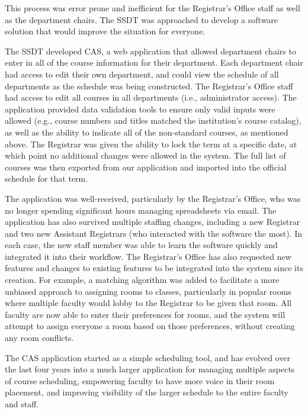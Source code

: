 This process was error prone and inefficient for the Registrar's Office staff as well as the department chairs. The SSDT was approached to develop a software solution that would improve the situation for everyone.

The SSDT developed CAS, a web application that allowed department chairs to enter in all of the course information for their department. Each department chair had access to edit their own department, and could view the schedule of all departments as the schedule was being constructed. The Registrar's Office staff had access to edit all courses in all departments (i.e., administrator access). The application provided data validation tools to ensure only valid inputs were allowed (e.g., course numbers and titles matched the institution's course catalog), as well as the ability to indicate all of the non-standard courses, as mentioned above. The Registrar was given the ability to lock the term at a specific date, at which point no additional changes were allowed in the system. The full list of courses was then exported from our application and imported into the official schedule for that term.

The application was well-received, particularly by the Registrar's Office, who was no longer spending significant hours managing spreadsheets via email. The application has also survived multiple staffing changes, including a new Registrar and two new Assistant Registrars (who interacted with the software the most). In each case, the new staff member was able to learn the software quickly and integrated it into their workflow. The Registrar's Office has also requested new features and changes to existing features to be integrated into the system since its creation. For example, a matching algorithm was added to facilitate a more unbiased approach to assigning rooms to classes, particularly in popular rooms where multiple faculty would lobby to the Registrar to be given that room. All faculty are now able to enter their preferences for rooms, and the system will attempt to assign everyone a room based on those preferences, without creating any room conflicts.

The CAS application started as a simple scheduling tool, and has evolved over the last four years into a much larger application for managing multiple aspects of course scheduling, empowering faculty to have more voice in their room placement, and improving visibility of the larger schedule to the entire faculty and staff.

